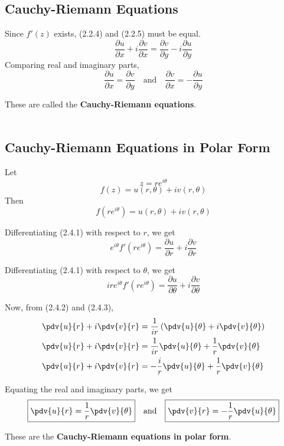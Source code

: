 \subsection{Cauchy-Riemann Equations}
Since $f'(z)$ exists, (2.2.4) and (2.2.5) must be equal.
\begin{equation}
    \frac{\partial u}{\partial x} + i\frac{\partial v}{\partial x} = \frac{\partial v}{\partial y} - i\frac{\partial u}{\partial y}
\end{equation}
Comparing real and imaginary parts,
\begin{equation}
    \boxed{ \frac{\partial u}{\partial x} = \frac{\partial v}{\partial y} }
    \quad \text{and} \quad 
    \boxed{ \frac{\partial v}{\partial x} = -\frac{\partial u}{\partial y} }
\end{equation}

These are called the \textbf{Cauchy-Riemann equations}. \\~\\


\subsection{Cauchy-Riemann Equations in Polar Form}
Let \[
    z = re^{i\theta}
\] \[
    f(z) = u(r,\theta) + iv(r,\theta)
\] 
Then
\begin{equation}
    f(re^{i\theta}) = u(r,\theta) + iv(r,\theta)
\end{equation}

Differentiating (2.4.1) with respect to $r$, we get
\begin{equation}
    e^{i\theta}f'(re^{i\theta}) = \frac{\partial u}{\partial r} + i\frac{\partial v}{\partial r}
\end{equation}

Differentiating (2.4.1) with respect to $\theta$, we get
\begin{equation}
    ire^{i\theta}f'(re^{i\theta}) = \frac{\partial {u}}{\partial {\theta}} + i\frac{\partial {v}}{\partial {\theta}}
\end{equation}

Now, from (2.4.2) and (2.4.3),
\begin{align*}
    \pdv{u}{r} + i \pdv{v}{r} &= \frac{1}{ir} \left( \pdv{u}{\theta} + i \pdv{v}{\theta} \right)  \\
    \pdv{u}{r} + i \pdv{v}{r} &= \frac{1}{ir} \pdv{u}{\theta} + \frac{1}{r} \pdv{v}{\theta} \\
    \pdv{u}{r} + i \pdv{v}{r} &= -\frac{i}{r} \pdv{u}{\theta} + \frac{1}{r} \pdv{v}{\theta}
\end{align*}

Equating the real and imaginary parts, we get
\begin{equation}
    \boxed{ \pdv{u}{r} = \frac{1}{r} \pdv{v}{\theta} }
    \quad \text{and} \quad 
    \boxed{ \pdv{v}{r} = -\frac{1}{r} \pdv{u}{\theta} }
\end{equation}

These are the \textbf{Cauchy-Riemann equations in polar form}.
